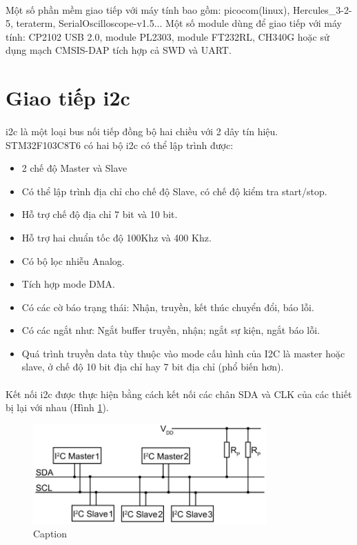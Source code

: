\paragraph{}
Một số phần mềm giao tiếp với máy tính bao gồm: picocom(linux), Hercules\_3-2-5, teraterm, SerialOscilloscope-v1.5... Một số module dùng để giao tiếp với máy tính: CP2102 USB 2.0, module PL2303, module FT232RL, CH340G hoặc sử dụng mạch CMSIS-DAP tích hợp cả SWD và UART.

\section{Giao tiếp \acrshort{i2c}}
\paragraph{}
\acrfull{i2c} là một loại bus nối tiếp đồng bộ hai chiều với 2 dây tín hiệu. STM32F103C8T6 có hai bộ \acrshort{i2c} có thể lập trình được:
\begin{itemize}
    \item 2 chế độ Master và Slave
    \item Có thể lập trình địa chỉ cho chế độ Slave, có chế độ kiểm tra start/stop.
    \item Hỗ trợ chế độ địa chỉ 7 bit và 10 bit.
    \item Hỗ trợ hai chuẩn tốc độ 100Khz và 400 Khz.
    \item Có bộ lọc nhiễu Analog.
    \item Tích hợp mode DMA.
    \item Có các cờ báo trạng thái: Nhận, truyền, kết thúc chuyển đổi, báo lỗi.
    \item Có các ngắt như: Ngắt buffer truyền, nhận; ngắt sự kiện, ngắt báo lỗi.
    \item Quá trình truyền data tùy thuộc vào mode cấu hình của I2C là master hoặc slave, ở chế độ 10 bit địa chỉ hay 7 bit địa chỉ (phổ biến hơn).
\end{itemize}
\paragraph{}
Kết nối \acrshort{i2c} được thực hiện bằng cách kết nối các chân SDA và CLK của các thiết bị lại với nhau (Hình \ref{fig:i2c-wiring}).
\begin{figure}[H]
    \centering
    \includegraphics[width=0.8\textwidth]{images/I2C-Bus-Layout.jpg}
    \caption{Caption}
    \label{fig:i2c-wiring}
\end{figure}
